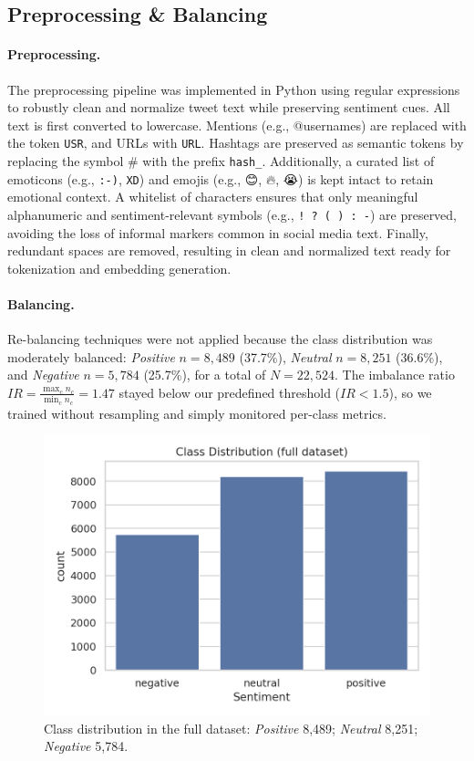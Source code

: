 \documentclass[10pt]{article}
\begin{document}
\subsection{Preprocessing \& Balancing}
\paragraph{Preprocessing.}
The preprocessing pipeline was implemented in Python using regular expressions to robustly clean and normalize tweet text while preserving sentiment cues.
All text is first converted to lowercase. Mentions (e.g., @usernames) are replaced with the token \texttt{USR}, and URLs with \texttt{URL}.
Hashtags are preserved as semantic tokens by replacing the symbol \# with the prefix \texttt{hash\_}.
Additionally, a curated list of emoticons (e.g., \texttt{:-)}, \texttt{XD}) and emojis (e.g., 😊, 🔥, 😭) is kept intact to retain emotional context.
A whitelist of characters ensures that only meaningful alphanumeric and sentiment-relevant symbols (e.g., \texttt{! ? ( ) : -}) are preserved, avoiding the loss of informal markers common in social media text.
Finally, redundant spaces are removed, resulting in clean and normalized text ready for tokenization and embedding generation.
\paragraph{Balancing.}
Re-balancing techniques were not applied because the class distribution was moderately balanced: \textit{Positive} $n=8{,}489$ (37.7\%), \textit{Neutral} $n=8{,}251$ (36.6\%), and \textit{Negative} $n=5{,}784$ (25.7\%), for a total of $N=22{,}524$. The imbalance ratio
$IR=\frac{\max_c n_c}{\min_c n_c}=1.47$ stayed below our predefined threshold ($IR<1.5$), so we trained without resampling and simply monitored per-class metrics.
\begin{figure}[H]
  \centering
  \includegraphics[width=0.6\linewidth]{../SCRITPS/artifacts/figures/class_distribution_full.png}
  \caption{Class distribution in the full dataset: \textit{Positive} 8{,}489; \textit{Neutral} 8{,}251; \textit{Negative} 5{,}784.}
  \label{fig:class-dist}
\end{figure}
\end{document}
